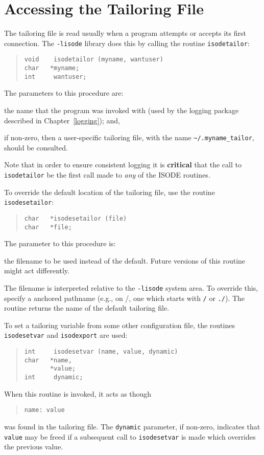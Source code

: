 \section	{Accessing the Tailoring File}
The tailoring file is read usually when a program attempts or accepts its
first connection.
The \verb"-lisode" library does this by calling the routine
\verb"isodetailor":
\begin{quote}\small\begin{verbatim}
void    isodetailor (myname, wantuser)
char   *myname;
int     wantuser;
\end{verbatim}\end{quote}
The parameters to this procedure are:
\begin{describe}
\item[\verb"myname":] the name that the program was invoked with
(used by the logging package described in Chapter~\ref{logging}); and,

\item[\verb"wantuser":] if non-zero,
then a user-specific tailoring file,
with the name \verb"~/.myname_tailor",
should be consulted.
\end{describe}
Note that in order to ensure consistent logging it is {\bf critical\/} that
the call to \verb"isodetailor" be the first call made to {\em any \/} of the
ISODE routines.

To override the default location of the tailoring file,
use the routine \verb"isodesetailor":
\begin{quote}\small\begin{verbatim}
char   *isodesetailor (file)
char   *file;
\end{verbatim}\end{quote}
The parameter to this procedure is:
\begin{describe}
\item[\verb"file":] the filename to be used instead of the default.
Future versions of this routine might act differently.
\end{describe}
The filename is interpreted relative to the \verb"-lisode" system area.
To override this, specify a anchored pathname
(e.g., on \unix/, one which starts with \verb"/" or \verb"./").
The routine returns the name of the default tailoring file.

To set a tailoring variable from some other configuration file,
the routines \verb"isodesetvar" and \verb"isodexport" are used:
\begin{quote}\small\begin{verbatim}
int     isodesetvar (name, value, dynamic)
char   *name,
       *value;
int     dynamic;
\end{verbatim}
\end{quote}
When this routine is invoked,
it acts as though
\begin{quote}\small\begin{verbatim}
name: value
\end{verbatim}\end{quote}
was found in the tailoring file.
The \verb"dynamic" parameter, if non-zero,
indicates that \verb"value" may be freed if a subsequent
call to \verb"isodesetvar" is made which overrides the previous value.

